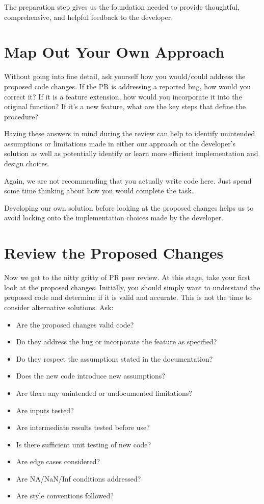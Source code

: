 \documentclass[
]{book}
\providecommand{\tightlist}{%
  \setlength{\itemsep}{0pt}\setlength{\parskip}{0pt}}
\begin{document}
The preparation step gives us the foundation needed to provide thoughtful, comprehensive, and helpful feedback to the developer.

\hypertarget{map-out-your-own-approach}{%
\section{Map Out Your Own Approach}\label{map-out-your-own-approach}}

Without going into fine detail, ask yourself how you would/could address the proposed code changes. If the PR is addressing a reported bug, how would you correct it? If it is a feature extension, how would you incorporate it into the original function? If it's a new feature, what are the key steps that define the procedure?

Having these answers in mind during the review can help to identify unintended assumptions or limitations made in either our approach or the developer's solution as well as potentially identify or learn more efficient implementation and design choices.

Again, we are not recommending that you actually write code here. Just spend some time thinking about how you would complete the task.

Developing our own solution before looking at the proposed changes helps us to avoid locking onto the implementation choices made by the developer.

\hypertarget{review-the-proposed-changes}{%
\section{Review the Proposed Changes}\label{review-the-proposed-changes}}

Now we get to the nitty gritty of PR peer review. At this stage, take your first look at the proposed changes. Initially, you should simply want to understand the proposed code and determine if it is valid and accurate. This is not the time to consider alternative solutions. Ask:

\begin{itemize}
\tightlist
\item
  Are the proposed changes valid code?
\item
  Do they address the bug or incorporate the feature as specified?
\item
  Do they respect the assumptions stated in the documentation?
\item
  Does the new code introduce new assumptions?
\item
  Are there any unintended or undocumented limitations?
\item
  Are inputs tested?
\item
  Are intermediate results tested before use?
\item
  Is there sufficient unit testing of new code?
\item
  Are edge cases considered?
\item
  Are NA/NaN/Inf conditions addressed?
\item
  Are style conventions followed?
\end{itemize}
\end{document}

